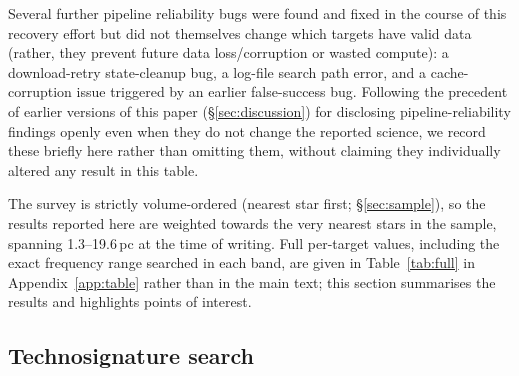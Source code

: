\documentclass{openjournal}
\begin{document}
Several further pipeline reliability bugs were found and fixed in the
course of this recovery effort but did not themselves change which
targets have valid data (rather, they prevent future data loss/corruption
or wasted compute): a download-retry state-cleanup bug, a log-file search
path error, and a cache-corruption issue triggered by an earlier
false-success bug. Following the precedent of earlier versions of this
paper (\S\ref{sec:discussion}) for disclosing pipeline-reliability
findings openly even when they do not change the reported science, we
record these briefly here rather than omitting them, without claiming
they individually altered any result in this table.

The survey is
strictly volume-ordered (nearest star first; \S\ref{sec:sample}), so the
results reported here are weighted towards the very nearest stars in the
sample, spanning 1.3--19.6\,pc at the time of writing. Full per-target
values, including the exact frequency range searched in each band, are
given in Table~\ref{tab:full} in Appendix~\ref{app:table} rather than in
the main text; this section summarises the results and highlights points
of interest.

\subsection{Technosignature search}
\end{document}
